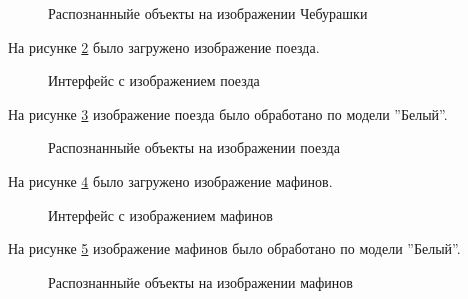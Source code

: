 \begin{figure}[H]
\caption{Распознанныйе объекты на изображении Чебурашки}
\label{systemtest_responce20:image}
\end{figure}

На рисунке \ref{systemtest_responce21:image} было загружено изображение поезда.

\begin{figure}[H]
\caption{Интерфейс с изображением поезда}
\label{systemtest_responce21:image}
\end{figure}

На рисунке \ref{systemtest_responce22:image} изображение поезда было обработано по модели ''Белый''.

\begin{figure}[H]
\caption{Распознанныйе объекты на изображении поезда}
\label{systemtest_responce22:image}
\end{figure}

На рисунке \ref{systemtest_responce23:image} было загружено изображение мафинов.

\begin{figure}[H]
\caption{Интерфейс с изображением мафинов}
\label{systemtest_responce23:image}
\end{figure}

На рисунке \ref{systemtest_responce24:image} изображение мафинов было обработано по модели ''Белый''.

\begin{figure}[H]
\caption{Распознанныйе объекты на изображении мафинов}
\label{systemtest_responce24:image}
\end{figure}
